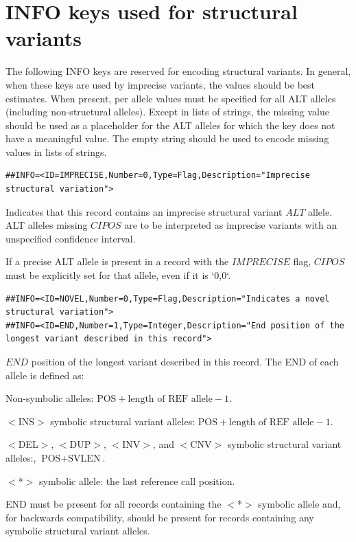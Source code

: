 \documentclass[8pt]{article}
\begin{document}
\section{INFO keys used for structural variants}
\label{sv-info-keys}
\begin{samepage}
The following INFO keys are reserved for encoding structural variants.
In general, when these keys are used by imprecise variants, the values should be best estimates.
When present, per allele values must be specified for all ALT alleles (including non-structural alleles).
Except in lists of strings, the missing value should be used as a placeholder for the ALT alleles for which the key does not have a meaningful value.
The empty string should be used to encode missing values in lists of strings.

\footnotesize
\begin{verbatim}
##INFO=<ID=IMPRECISE,Number=0,Type=Flag,Description="Imprecise structural variation">
\end{verbatim}
\normalsize

Indicates that this record contains an imprecise structural variant $ALT$ allele. ALT alleles missing $CIPOS$ are to be interpreted as imprecise variants with an unspecified confidence interval.

If a precise ALT allele is present in a record with the $IMPRECISE$ flag, $CIPOS$ must be explicitly set for that allele, even if it is `0,0`.

\footnotesize
\begin{verbatim}
##INFO=<ID=NOVEL,Number=0,Type=Flag,Description="Indicates a novel structural variation">
##INFO=<ID=END,Number=1,Type=Integer,Description="End position of the longest variant described in this record">
\end{verbatim}
\normalsize

$END$ position of the longest variant described in this record.
The END of each allele is defined as:

Non-symbolic alleles: $\mbox{POS} + \mbox{length of REF allele} - 1$.

$<$INS$>$ symbolic structural variant alleles: $\mbox{POS} + \mbox{length of REF allele} - 1$.

$<$DEL$>$, $<$DUP$>$, $<$INV$>$, and $<$CNV$>$ symbolic structural variant alleles:, $\mbox{POS} + \mbox{SVLEN}$.

$<$*$>$ symbolic allele: the last reference call position.

END must be present for all records containing the $<$*$>$ symbolic allele and, for backwards compatibility, should be present for records containing any symbolic structural variant alleles.


\end{samepage}
\end{document}
